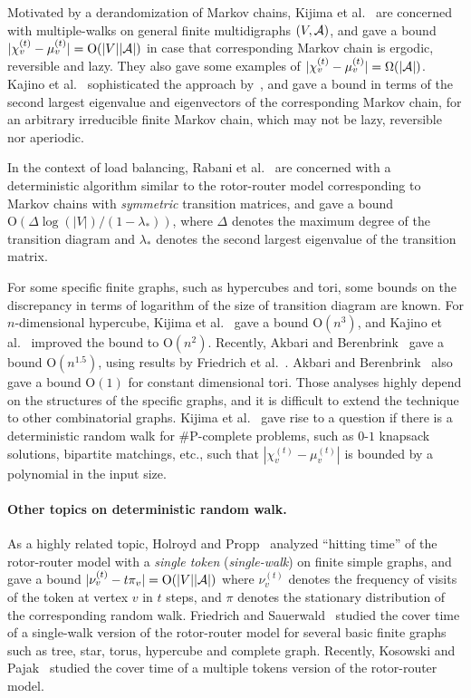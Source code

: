 \documentclass[letter, 11pt]{article}
\newcommand{\Order}{\mathrm{O}}
\newcommand{\1}{\mbox{1}\hspace{-0.25em}\mbox{l}}
\begin{document}
Motivated by a derandomization of Markov chains, 
 Kijima et al.~\cite{KKM12} are concerned with multiple-walks 
  on general finite multidigraphs $(V, {\cal A})$, and 
  gave a bound $|\chi^{(t)}_v - \mu^{(t)}_v| = \Order(|V||{\cal A}|)$ 
  in case that corresponding Markov chain is ergodic, reversible and lazy. 
 They also gave some examples of $|\chi^{(t)}_v - \mu^{(t)}_v|=\Omega({|\cal A}|)$. 
Kajino et al.~\cite{KKM13} 
  sophisticated the approach by~\cite{KKM12}, and 
  gave a bound in terms of the second largest eigenvalue and eigenvectors of the corresponding Markov chain, 
  for an arbitrary irreducible finite Markov chain, 
    which may not be lazy, reversible nor aperiodic. 

 In the context of load balancing, 
  Rabani et al.~\cite{RSW98} are concerned with a deterministic algorithm 
  similar to the rotor-router model corresponding to Markov chains with {\em symmetric} transition matrices, and 
  gave a bound $\Order(\Delta \log(|V|)/(1-\lambda_*))$, where 
   $\Delta$ denotes the maximum degree of the transition diagram and 
   $\lambda_*$ denotes the second largest eigenvalue of the transition matrix.  

For some specific finite graphs, 
  such as hypercubes and tori, some bounds on the discrepancy in terms of logarithm of the size of transition diagram 
  are known. 
For $n$-dimensional hypercube, 
  Kijima et al.~\cite{KKM12} gave a bound $\Order(n^3)$, and 
  Kajino et al.~\cite{KKM13} improved the bound to $\Order(n^2)$. 
Recently, 
  Akbari and Berenbrink~\cite{AB13} gave a bound $\Order(n^{1.5})$, 
  using results by Friedrich et al.~\cite{FGS12}. 
Akbari and Berenbrink~\cite{AB13} also gave a bound $\Order(1)$ 
  for constant dimensional tori.  
Those analyses highly depend on the structures of the specific graphs, and 
it is difficult to extend the technique to other combinatorial graphs.  
Kijima et al.~\cite{KKM12} gave rise to a question 
  if there is a deterministic random walk 
   for {\#}P-complete problems, such as $0$-$1$ knapsack solutions, bipartite matchings, etc., 
  such that $|\chi^{(t)}_v - \mu^{(t)}_v|$ is bounded by a polynomial in the input size.  

\paragraph{Other topics on deterministic random walk.}
As a highly related topic, 
 Holroyd and Propp~\cite{HP10} analyzed 
   ``hitting time'' of the rotor-router model 
   with a {\em single token} ({\em single-walk}) on finite simple graphs, and  
  gave a bound $|\nu^{(t)}_v - t \pi_v| = \Order(|V||{\cal A}|)$ 
  where $\nu^{(t)}_v$ denotes the frequency of visits of the token at vertex $v$ in $t$ steps, and 
  $\pi$ denotes the stationary distribution of the corresponding random walk. 
Friedrich and Sauerwald~\cite{FS10} 
   studied the cover time of a single-walk version of the rotor-router model 
   for several basic finite graphs such as tree, star, torus, hypercube and complete graph. 
Recently, Kosowski and Pajak~\cite{KP14} studied the cover time of a multiple tokens version of the rotor-router model. 
\end{document}
